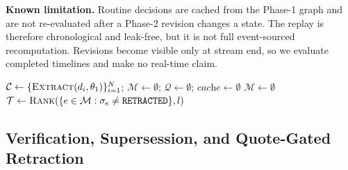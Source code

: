 \documentclass[journal]{IEEEtran}
\begin{document}
\textbf{Known limitation.} Routine decisions are cached from the Phase-1 graph and are not re-evaluated after a Phase-2 revision changes a state. The replay is therefore chronological and leak-free, but it is not full event-sourced recomputation. Revisions become visible only at stream end, so we evaluate completed timelines and make no real-time claim.

\begin{algorithm}[t]
\footnotesize
\caption{\textbf{ReviTLS}: two-phase schedule with chronological replay}
\label{alg:revitls}
\DontPrintSemicolon
{}
$\mathcal{C} \leftarrow \{\textsc{Extract}(d_i,\theta_1)\}_{i=1}^N$; $\mathcal{M}\leftarrow\emptyset$; $\mathcal{Q}\leftarrow\emptyset$; $\textit{cache}\leftarrow\emptyset$\;
$\mathcal{M}\leftarrow\emptyset$\;
$\mathcal{T}\leftarrow\textsc{Rank}(\{e\in\mathcal{M}:\sigma_e\ne\texttt{RETRACTED}\},l)$ 
\end{algorithm}

\subsection{Verification, Supersession, and Quote-Gated Retraction}
\label{subsec:verification}
\end{document}
